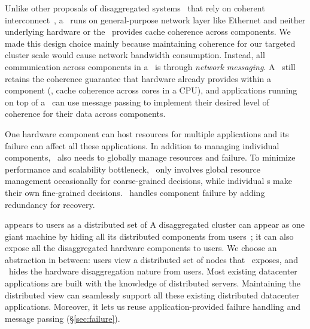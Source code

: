 \documentclass[10pt,times,twocolumn]{z2-article}
\begin{document}
Unlike other proposals of disaggregated systems~\cite{HP-TheMachine} that rely on coherent interconnect~\cite{GenZ,ccix,OpenCAPI},
a \splitkernel\ runs on general-purpose network layer like Ethernet and 
neither underlying hardware or the \splitkernel\ provides cache coherence across components.
We made this design choice mainly because maintaining coherence for our targeted cluster scale 
would cause network bandwidth consumption.
Instead, all communication across components in a \splitkernel\ is through {\em network messaging}.
A \splitkernel\ still retains the coherence guarantee that hardware already provides within a component (\eg, cache coherence across cores in a CPU),
and applications running on top of a \splitkernel\ can use message passing to implement their desired level of coherence for their data across components.

One hardware component can host resources for multiple applications and its failure can affect all these applications.
In addition to managing individual components, \splitkernel\ also needs to 
globally manage resources and failure.
To minimize performance and scalability bottleneck,
\splitkernel\ only involves global resource management occasionally for coarse-grained decisions, 
while individual \microos{}s make their own fine-grained decisions.
\splitkernel\ handles component failure by adding redundancy for recovery.



\splitkernel appears to users as a distributed set of 
A disaggregated cluster can appear as one giant machine by hiding all its distributed components from users~\cite{Amoeba-Experience};
it can also expose all the disaggregated hardware components to users.
We choose an abstraction in between: users view a distributed set of nodes that \splitkernel\ exposes,
and \splitkernel\ hides the hardware disaggregation nature from users.
Most existing datacenter applications are built with the knowledge of distributed servers.
Maintaining the distributed view can seamlessly support all these existing distributed datacenter applications.
Moreover, it lets us reuse application-provided failure handling and message passing (\S\ref{sec:failure}).
\end{document}
